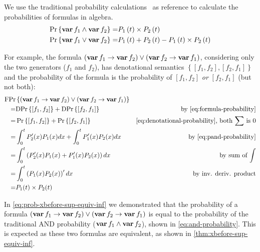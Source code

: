 \documentclass[12pt,openright,twoside,a4paper,oldfontcommands,english,brazil,final]{abntex2}
\theoremstyle{theo}
\def\varop{\ensuremath\operatorname{\mathbf{var}}}
\newcommand{\var}[1]{\ensuremath\varop #1}
\def\xbeforeop{\ensuremath\rightarrow}
\newcommand{\xbefore}[2]{\ensuremath #1 \xbeforeop #2 }
\def\probabilityop{\ensuremath \Pr}
\newcommand{\probability}[1]{\ensuremath \probabilityop\left\{#1\right\}}
\def\denotationalprobop{\ensuremath\mathrm{DPr}}
\newcommand{\denotationalprob}[1]{\ensuremath \denotationalprobop\left\{#1\right\}}
\def\formulaprobop{\ensuremath\mathrm{FPr}}
\newcommand{\Fit}[1]{\ensuremath P_{#1}\left(t\right)}
\newcommand{\vari}[1]{\ensuremath\var{f_{#1}}}
\begin{document}
We use the traditional probability calculations~\cite{Merle2010} as reference to calculate the probabilities of formulas in \ac{algebra}.
\begin{subequations}
\begin{align}
\probability{\vari{1} \land \vari{2}} = & \Fit{1} \times \Fit{2}\label{eq:and-probability}\\
\probability{\vari{1} \lor \vari{2}} = & \Fit{1} + \Fit{2} - \Fit{1} \times \Fit{2}\label{eq:or-probability}
\end{align}
\end{subequations}

For example, the formula $\left(\xbefore{\var{f_1}}{\var{f_2}}\right) \lor \left(\xbefore{\var{f_2}}{\var{f_1}}\right)$, considering only the two generators ($f_1$ and $f_2$), has denotational semantics $\left\{\left[f_1, f_2\right], \left[f_2, f_1\right]\right\}$ and the probability of the formula is the probability of $\left[f_1, f_2\right]$ \emph{or} $\left[f_2, f_1\right]$ (but not both):
%
\begin{align}
\formulaprobop&\left\{\left(\xbefore{\var{f_1}}{\var{f_2}}\right) \lor \left(\xbefore{\var{f_2}}{\var{f_1}}\right)\right\}\nonumber\\
=&\denotationalprob{\left[f_1,f_2\right]} + \denotationalprob{\left[f_2,f_1\right]} & \text{by \cref{eq:formula-probability}} \nonumber\\
= &\probability{\left[f_1,f_2\right]} + \probability{\left[f_2,f_1\right]} & \text{\cref{eq:denotational-probability}, both $\sum$ is $0$}\nonumber\\
=&\int_0^t P'_2(x) P_1(x) dx + \int_0^t P'_1(x) P_2(x) dx & \text{by \cref{eq:pand-probability}} \nonumber\\
= & \int_0^t \left(P'_2(x) P_1(x) + P'_1(x) P_2(x)\right) dx & \text{by sum of $\int$} \nonumber\\
= & \int_0^t \left(P_1(x) P_2(x)\right)' dx & \text{by inv. deriv. product} \nonumber\\
= & P_1(t) \times P_2(t)\label{eq:prob-xbefore-sup-equiv-inf}
\end{align}

In \cref{eq:prob-xbefore-sup-equiv-inf} we demonstrated that the probability of a formula $\left(\xbefore{\var{f_1}}{\var{f_2}}\right) \lor \left(\xbefore{\var{f_2}}{\var{f_1}}\right)$ is equal to the probability of the traditional \ac{AND} probability ($\var{f_1} \land \var{f_2}$), shown in \cref{eq:and-probability}.
This is expected as these two formulas are equivalent, as shown in \cref{thm:xbefore-sup-equiv-inf}.
\end{document}
